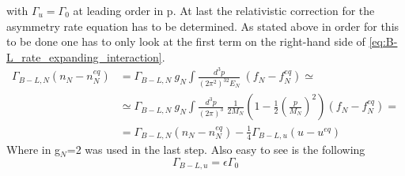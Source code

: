 with $\Gamma_u=\Gamma_0$ at leading order in p. \newline
At last the relativistic correction for the asymmetry rate equation has to be determined. As stated above in order for this to be done one has to only look at the first term on the right-hand side of \ref{eq:B-L_rate_expanding_interaction}.
\begin{align*}
	\Gamma_{B-L,N}\left(n_N-n_N^{eq}\right)&=\Gamma_{B-L,N}\:g_N\int \frac{d^3p}{\left(2\pi^2\right)^32E_N}\:\left(f_N-f_N^{eq}\right)\simeq\\
	&\simeq\Gamma_{B-L,N}\:g_N\int\frac{d^3p}{\left(2\pi\right)^3}\:\frac{1}{2M_N}\left(1-\frac{1}{2}\left(\frac{p}{M_N}\right)^2\right)\left(f_N-f_N^{eq}\right)=\\
	&=\Gamma_{B-L,N}\left(n_N-n_N^{eq}\right)-\frac{1}{4}\Gamma_{B-L,u}\left(u-u^{eq}\right)
\end{align*}
Where in g$_N$=2 was used in the last step.\newline
Also easy to see is the following
\begin{equation*}
	\Gamma_{B-L,u}=\epsilon\Gamma_0
\end{equation*}

